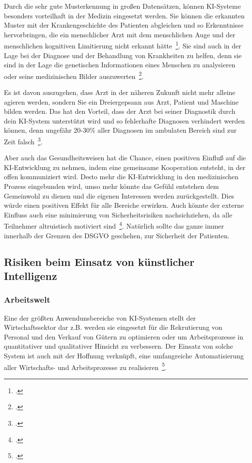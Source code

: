 Durch die sehr gute Musterkennung in großen Datensätzen, können \ac{KI}-Systeme besonders vorteilhaft in der Medizin eingesetzt werden. Sie können die erkannten Muster mit
der Krankengeschichte des Patienten abgleichen und so Erkenntnisse hervorbringen, die ein menschlicher Arzt mit dem menschlichen Auge und der menschlichen kognitiven Limitierung nicht 
erkannt hätte~\footcite[\vglf][]{Buchkremer.2020}. Sie sind auch in der Lage bei der Diagnose und der Behandlung von Krankheiten zu helfen, denn sie sind in der Lage
die genetischen Informationen eines Menschen zu analysieren oder seine medizinischen Bilder auszuwerten~\footcite[\vglf][]{Robot.2023}.

Es ist davon auszugehen, dass Arzt in der näheren Zukunft nicht mehr alleine agieren werden, sondern Sie ein Dreiergepsann aus Arzt, Patient und Maschine bilden werden. 
Das hat den Vorteil, dass der Arzt bei seiner Diagnostik durch dein \ac{KI}-System unterstützt wird und so fehlerhafte Diagnosen verhindert werden können, denn ungefähr 
20-30\% aller Diagnosen im ambulaten Bereich sind zur Zeit falsch~\footcite[\vglf][]{Buchkremer.2020}.

Aber auch das Gesundheitsweisen hat die Chance, einen positiven Einfluß auf die \ac{KI}-Entwicklung zu nehmen, indem eine gemeinsame Kooperation entsteht, in der offen kommuniziert wird.
Desto mehr die \ac{KI}-Entwicklung in den medizinischen Prozess eingebunden wird, umso mehr könnte das Gefühl entstehen dem Gemeinwohl zu dienen und die eigenen
Interessen werden zurückgestellt. Dies würde einen positiven Effekt für alle Bereiche erwirken. Auch könnte der externe Einfluss auch eine minimierung von 
Sicherheitsrisiken nachsichziehen, da alle Teilnehmer altruistisch motiviert sind~\footcite[\vglf][]{Buchkremer.2020}. 
Natürlich sollte das ganze immer innerhalb der Grenzen des \ac{DSGVO} geschehen, zur Sicherheit der Patienten.

\subsection{Risiken beim Einsatz von künstlicher Intelligenz}
\subsubsection{Arbeitswelt}
Eine der größten Anwendunsbereiche von \ac{KI}-Systemen stellt der Wirtschaftssektor dar z.B. werden sie eingesetzt für die Rekrutierung von Personal und den Verkauf von Gütern zu optimieren oder um
Arbeitsprozesse in quantitativer und qualitativer Hinsicht zu verbessern. Der Einsatz von solche System ist auch mit der Hoffnung verknüpft, eine umfangreiche
Automatisierung aller Wirtschafts- und Arbeitsprozesse zu realisieren~\footcite[\vglf][]{Heinrichs.2022}.

